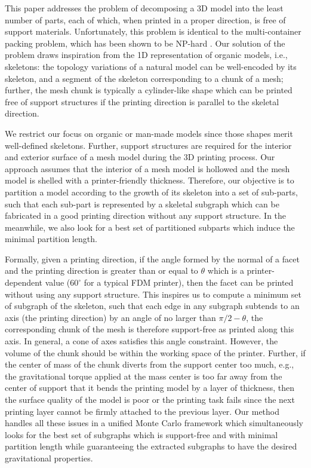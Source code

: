This paper addresses the problem of decomposing a 3{D} model into the least number of parts, each of which, when printed in a proper direction, is free of support materials. Unfortunately, this problem is identical to the multi-container packing problem, which has been shown to be NP-hard \cite{Fukunaga:2007}. Our solution of the problem draws inspiration from the 1{D} representation of organic models, i.e., skeletons: the topology variations of a natural model can be well-encoded by its skeleton, and a segment of the skeleton corresponding to a chunk of a mesh; further, the mesh chunk is typically a cylinder-like shape which can be printed free of support structures if the printing direction is parallel to the skeletal direction.

We restrict our focus on organic or man-made models since those shapes merit well-defined skeletons. Further, support structures are required for the interior and exterior surface of a mesh model during the 3{D} printing process. Our approach assumes that the interior of a mesh model is hollowed and the mesh model is shelled with a printer-friendly thickness. Therefore, our objective is to partition a model according to the growth of its skeleton into a set of sub-parts, such that each sub-part is represented by a skeletal subgraph which can be fabricated in a good printing direction without any support structure. In the meanwhile, we also look for a best set of partitioned subparts which induce the minimal partition length.

Formally, given a printing direction, if the angle formed by the normal of a facet and the printing direction is greater than or equal to $\theta$ which is a printer-dependent value ($60^{\circ}$ for a typical FDM printer), then the facet can be printed without using any support structure. This inspires us to compute a minimum set of subgraph of the skeleton, such that each edge in any subgraph subtends to an axis (the printing direction) by an angle of no larger than $\pi/2 - \theta$, the corresponding chunk of the mesh is therefore support-free as printed along this axis. In general, a cone of axes satisfies this angle constraint. However, the volume of the chunk should be within the working space of the printer. Further, if the center of mass of the chunk diverts from the support center too much, e.g., the gravitational torque applied at the mass center is too far away from the center of support that it bends the printing model by a layer of thickness, then the surface quality of the model is poor or the printing task fails since the next printing layer cannot be firmly attached to the previous layer. Our method handles all these issues in a unified Monte Carlo framework which simultaneously looks for the best set of subgraphs which is support-free and with minimal partition length while guaranteeing the extracted subgraphs to have the desired gravitational properties.


